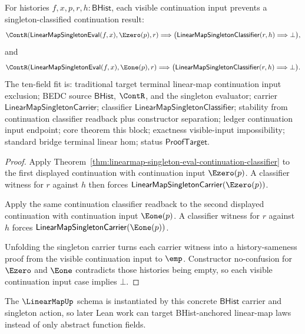 \begin{theorem}
\label{thm:linearmap-singleton-eval-continuation-visible-input-exclusion}
For histories $f,x,p,r,h:\mathsf{BHist}$, each visible continuation input
prevents a singleton-classified continuation result:
$$
\ContR(\mathsf{LinearMapSingletonEval}(f,x),\Ezero(p),r)
\Longrightarrow
\bigl(\mathsf{LinearMapSingletonClassifier}(r,h)\Longrightarrow\bot\bigr),
$$
and
$$
\ContR(\mathsf{LinearMapSingletonEval}(f,x),\Eone(p),r)
\Longrightarrow
\bigl(\mathsf{LinearMapSingletonClassifier}(r,h)\Longrightarrow\bot\bigr).
$$
The ten-field fit is: traditional target terminal linear-map continuation
input exclusion; BEDC source $\mathsf{BHist}$, $\ContR$, and the singleton
evaluator; carrier $\mathsf{LinearMapSingletonCarrier}$; classifier
$\mathsf{LinearMapSingletonClassifier}$; stability from continuation
classifier readback plus constructor separation; ledger continuation input
endpoint; core theorem this block; exactness visible-input impossibility;
standard bridge terminal linear hom; status $\mathsf{ProofTarget}$.
\end{theorem}
\begin{proof}
Apply Theorem~\ref{thm:linearmap-singleton-eval-continuation-classifier} to
the first displayed continuation with continuation input $\Ezero(p)$. A
classifier witness for $r$ against $h$ then forces
$\mathsf{LinearMapSingletonCarrier}(\Ezero(p))$.

Apply the same continuation classifier readback to the second displayed
continuation with continuation input $\Eone(p)$. A classifier witness for $r$
against $h$ forces $\mathsf{LinearMapSingletonCarrier}(\Eone(p))$.

Unfolding the singleton carrier turns each carrier witness into a
history-sameness proof from the visible continuation input to $\emp$.
Constructor no-confusion for $\Ezero$ and $\Eone$ contradicts those histories
being empty, so each visible continuation input case implies $\bot$.
\end{proof}

The $\LinearMapUp$ schema is instantiated by this concrete $\mathsf{BHist}$
carrier and singleton action, so later Lean work can target BHist-anchored
linear-map laws instead of only abstract function fields.
